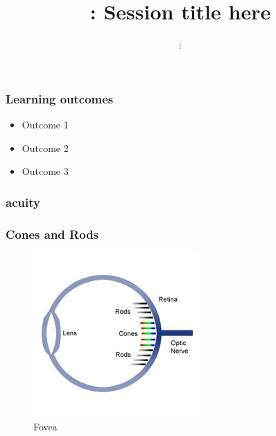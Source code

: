 \usepackage{../../beamerthemeFalmouthGamesAcademy}
\usepackage{multimedia}
\graphicspath{ {../../} }


\usepackage[normalem]{ulem}
\usepackage{wasysym}

\usepackage{pdfpages}

\usetikzlibrary{arrows,automata}




\title{\sessionnumber: Session title here}
\subtitle{\modulecode: \moduletitle}

\frame{\titlepage} 

\begin{frame}
	\frametitle{Learning outcomes}
	\begin{itemize}
		\item Outcome 1
		\item Outcome 2
		\item Outcome 3
	\end{itemize}
\end{frame}

\begin{frame}
	\frametitle{acuity}
	
\end{frame}

\begin{frame}
	\frametitle{Cones and Rods}
	\begin{figure}
		\includegraphics[scale=.5]{assets/cones-rods.jpg}
		\caption{ Fovea }
	\end{figure}
\end{frame}

